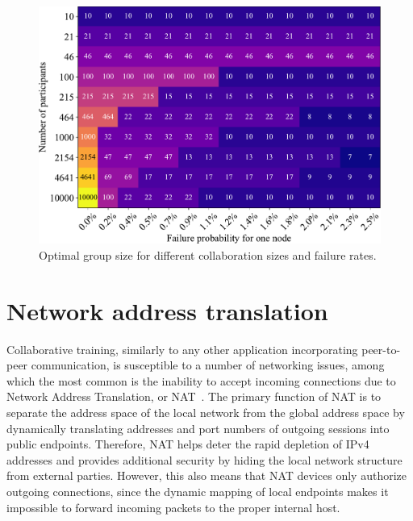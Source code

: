\begin{figure}
    \centering
    \includegraphics[width=0.95\linewidth]{resources/optimal_group_size.pdf}
    \caption{Optimal group size for different collaboration sizes and failure rates.}
    \label{fig:optimal_m}
    \vspace{-16pt}
\end{figure}


\section{Network address translation}\label{appendix:nat_firewall}

Collaborative training, similarly to any other application incorporating peer-to-peer communication, is susceptible to a number of networking issues, among which the most common is the inability to accept incoming connections due to Network Address Translation, or NAT~\cite{Biggadike05natblaster:establishing}. The primary function of NAT is to separate the address space of the local network from the global address space by dynamically translating addresses and port numbers of outgoing sessions into public endpoints. Therefore, NAT helps deter the rapid depletion of IPv4 addresses and provides additional security by hiding the local network structure from external parties. However, this also means that NAT devices only authorize outgoing connections, since the dynamic mapping of local endpoints makes it impossible to forward incoming packets to the proper internal host.

